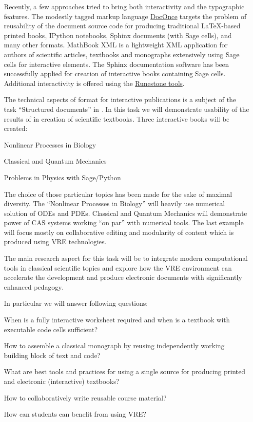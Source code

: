 \begin{workpackage}
\begin{tasklist}
\begin{task}[title=Demonstrator: Interactive books,
id=ibook,lead=US,PM=30]
Recently, a few approaches tried to bring both interactivity and the
typographic features. The modestly tagged markup language
\href{http://hplgit.github.io/doconce/doc/web/}{DocOnce}
targets the problem of reusability of the document source code for
producing traditional LaTeX-based printed books, IPython notebooks, Sphinx
documents (with Sage cells), and many other formats. MathBook XML
is a lightweight XML application for authors of scientific articles,
textbooks and monographs extensively using Sage cells for
interactive elements. The Sphinx documentation software has been
successfully applied for creation of interactive books containing Sage
cells. Additional interactivity is offered using the \href{http://runestoneinteractive.org}{Runestone tools}.

The technical aspects of format for interactive publications is a
subject of the task ``Structured documents'' in
. In this task we will demonstrate usability
of the results of  in creation of scientific
textbooks. Three interactive books will be created:

\begin{compactitem}
\item Nonlinear Processes in Biology
\item Classical and Quantum Mechanics
\item Problems in Physics with Sage/Python
\end{compactitem}

The choice of those particular topics has been made for the sake of
maximal diversity. The ``Nonlinear Processes in Biology'' will heavily
use numerical solution of ODEs and PDEs.
Classical and Quantum Mechanics will demonstrate power of
CAS systems working ``on par'' with numerical tools. The last example
will focus mostly on collaborative editing and modularity of content
which is produced using VRE technologies.

The main research aspect for this task will be to integrate modern
computational tools in classical scientific topics and explore how
the VRE environment can accelerate the development and produce electronic
documents with significantly enhanced pedagogy.

In particular we will answer following questions:

\begin{compactitem}
\item When is a fully interactive worksheet required and when is
  a textbook with executable code cells sufficient?
\item How to assemble a classical monograph by reusing independently working
  building block of text and code?
\item What are best tools and practices for using a single source for
  producing printed and electronic (interactive) textbooks?
\item How to collaboratively write reusable course material?
\item How can students can benefit from using VRE?
\end{compactitem}



\end{task}
\end{tasklist}
\end{workpackage}
